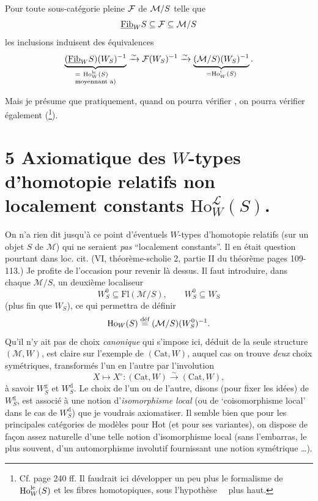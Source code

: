  Pour toute sous-catégorie pleine $\cF$ de $\cM/S$ telle que
\[
\Fib_W S \subseteq \cF \subseteq \cM/S
\]
les inclusions induisent des équivalences
\[
\underbrace{(\Fib_W S)(W_S)^{-1}}_{\begin{subarray}{l} = \ \Ho^{\lc}_W(S)\\ \text{moyennant a)}\end{subarray}} \xrightarrow{\sim} \cF(W_S)^{-1} \xrightarrow{\sim} \underbrace{(\cM/S)(W_S)^{-1}}_{=\Ho^!_W(S)}.
\]

Mais je présume que pratiquement, quand on pourra vérifier , on pourra vérifier  également (\footnote[123]{Cf. page 240 ff. Il faudrait ici développer un peu plus le formalisme de $\Ho^{\lc}_W(S)$ et les fibres homotopiques, sous l'hypothèse \, \ plus haut.}).


\section*{5 Axiomatique des $W$-types d'homotopie relatifs non localement constants $\mathrm{Ho}^{\mathcal{L}}_W(S)$.}

On n'a rien dit jusqu'à ce point d'éventuels $W$-types d'homotopie relatifs (sur un objet $S$ de $\mathcal{M}$) qui ne seraient \textit{pas} ``localement constants''. Il en était question pourtant dans loc. cit. (VI, théorème-scholie 2, partie II du théorème pages 109-113.) Je profite de l'occasion pour revenir là dessus. Il faut introduire, dans chaque $\mathcal{M}/S$, un deuxième localiseur
\[
W^0_S \subseteq \mathrm{Fl}(\mathcal{M}/S), \qquad W^0_S \subseteq W_S
\]
(plus fin que $W_S$), ce qui permettra de définir
\[
\mathrm{Ho}_W(S) \deff (\mathcal{M}/S)(W^0_S)^{-1}.
\]
Qu'il n'y ait pas de choix \textit{canonique} qui s'impose ici, déduit de la seule structure $(\mathcal{M},W)$, est claire sur l'exemple de $(\mathrm{Cat},W)$, auquel cas on trouve \textit{deux} choix symétriques, transformés l'un en l'autre par l'involution
\[
X \longmapsto X^\circ : (\mathrm{Cat},W) \xrightarrow{\sim} (\mathrm{Cat},W),
\]
à savoir $W^{\mathrm{g}}_S$ et $W^{\mathrm{d}}_S$. Le choix de l'un ou de l'autre, disons (pour fixer les idées) de $W^{\mathrm{g}}_S$, est associé à une notion d'\textit{isomorphisme local} (ou de `coisomorphisme local' dans le cas de $W^{\mathrm{d}}_S$) que je voudrais axiomatiser. Il semble bien que pour les principales catégories de modèles pour Hot (et pour ses variantes), on dispose de façon assez naturelle d'une telle notion d'isomorphisme local (sans l'embarras, le plus souvent, d'un automorphisme involutif fournissant une notion symétrique \dots).

